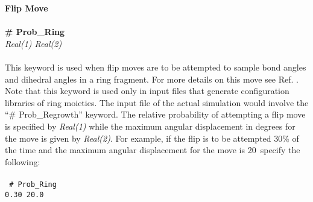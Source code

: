 %
{\bf Flip Move}\\ \\
{\bf \# Prob\_Ring} \\
{\it Real(1) Real(2)} \\ \\
%
This keyword is used when flip moves are to be attempted to sample bond angles and 
dihedral angles in a ring fragment. 
For more details on this move see Ref. \cite{Shah:2011}. 
Note that this keyword is used only in input files
that generate configuration libraries of ring moieties. The input file of the 
actual simulation would involve the ``\# Prob\_Regrowth'' keyword.
The relative probability of attempting a flip move is 
specified by {\it Real(1)} while the maximum angular displacement 
in degrees for the move is given by {\it Real(2)}. 
For example, if the flip is to be attempted 30\% of the 
time and the maximum angular displacement for the 
move is 20\degree~specify the following: \\ \\
%
\texttt{
\# Prob\_Ring \\
0.30 20.0 \\ \\}
%
%
